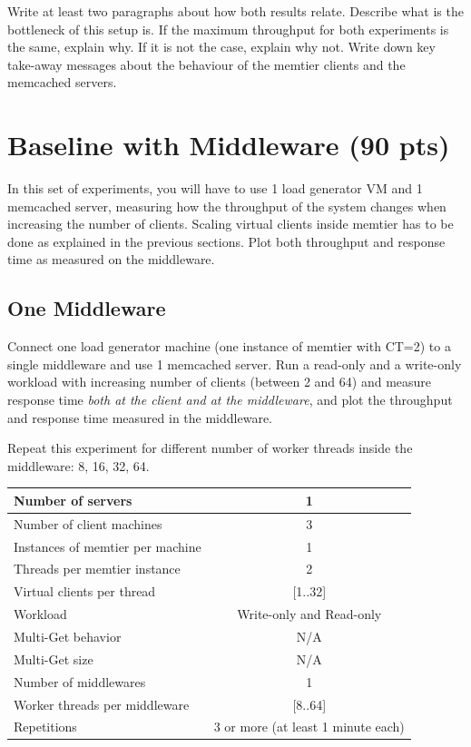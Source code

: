 \documentclass[11pt,a4paper]{article}
\begin{document}
Write at least two paragraphs about how both results relate. Describe what is the bottleneck of this setup is. If the maximum throughput for both experiments is the same, explain why. If it is not the case, explain why not. Write down key take-away messages about the behaviour of the memtier clients and the memcached servers.

\section{Baseline with Middleware (90 pts)}

In this set of experiments, you will have to use 1 load generator VM and 1 memcached server, measuring how the throughput of the system changes when increasing the number of clients. Scaling virtual clients inside memtier has to be done as explained in the previous sections. Plot both throughput and response time as measured on the middleware.

\subsection{One Middleware}

Connect one load generator machine (one instance of memtier with CT=2) to a single middleware and use 1 memcached server. Run a read-only and a write-only workload with increasing number of clients (between 2 and 64) and measure response time \emph{both at the client and at the middleware}, and plot the throughput and response time measured in the middleware.

Repeat this experiment for different number of worker threads inside the middleware: 8, 16, 32, 64.

\begin{center}
	\scriptsize{
		\begin{tabular}{|l|c|}
			\hline Number of servers                & 1                        \\ 
			\hline Number of client machines        & 3                        \\ 
			\hline Instances of memtier per machine & 1                        \\ 
			\hline Threads per memtier instance     & 2                        \\
			\hline Virtual clients per thread       & [1..32]                  \\ 
			\hline Workload                         & Write-only and Read-only \\
			\hline Multi-Get behavior               & N/A                      \\
			\hline Multi-Get size                   & N/A                      \\
			\hline Number of middlewares            & 1                        \\
			\hline Worker threads per middleware    & [8..64]                  \\
			\hline Repetitions                      & 3 or more (at least 1 minute each)                \\ 
			\hline 
		\end{tabular}
	} 
\end{center}
\end{document}
